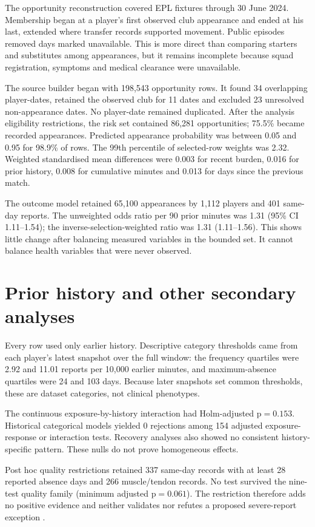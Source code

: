 \documentclass[11pt]{article}
\newcommand{\pval}{\mathrm{p}}
\begin{document}
The opportunity reconstruction covered EPL fixtures through 30 June 2024. Membership began at a player's first observed club appearance and ended at his last, extended where transfer records supported movement. Public episodes removed days marked unavailable. This is more direct than comparing starters and substitutes among appearances, but it remains incomplete because squad registration, symptoms and medical clearance were unavailable.

The source builder began with 198,543 opportunity rows. It found 34 overlapping player-dates, retained the observed club for 11 dates and excluded 23 unresolved non-appearance dates. No player-date remained duplicated. After the analysis eligibility restrictions, the risk set contained 86,281 opportunities; 75.5\% became recorded appearances. Predicted appearance probability was between 0.05 and 0.95 for 98.9\% of rows. The 99th percentile of selected-row weights was 2.32. Weighted standardised mean differences were 0.003 for recent burden, 0.016 for prior history, 0.008 for cumulative minutes and 0.013 for days since the previous match.

The outcome model retained 65,100 appearances by 1,112 players and 401 same-day reports. The unweighted odds ratio per 90 prior minutes was 1.31 (95\% CI 1.11--1.54); the inverse-selection-weighted ratio was 1.31 (1.11--1.56). This shows little change after balancing measured variables in the bounded set. It cannot balance health variables that were never observed.

\section{Prior history and other secondary analyses}

Every row used only earlier history. Descriptive category thresholds came from each player's latest snapshot over the full window: the frequency quartiles were 2.92 and 11.01 reports per 10,000 earlier minutes, and maximum-absence quartiles were 24 and 103 days. Because later snapshots set common thresholds, these are dataset categories, not clinical phenotypes.

The continuous exposure-by-history interaction had Holm-adjusted $\pval=0.153$. Historical categorical models yielded 0 rejections among 154 adjusted exposure-response or interaction tests. Recovery analyses also showed no consistent history-specific pattern. These nulls do not prove homogeneous effects.

Post hoc quality restrictions retained 337 same-day records with at least 28 reported absence days and 266 muscle/tendon records. No test survived the nine-test quality family (minimum adjusted $\pval=0.061$). The restriction therefore adds no positive evidence and neither validates nor refutes a proposed severe-report exception \cite{hoenig2022citizen_transfermarkt}.
\end{document}

